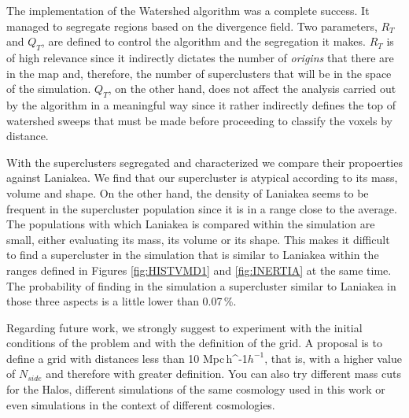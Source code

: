 \documentclass[usenatbib]{mnras}
\newcommand{\Mpch}{\,{\rm Mpc}\,\ifmmode h^{-1}\else $h^{-1}$\fi}
\begin{document}
The implementation of the Watershed algorithm was a complete
success. It managed to segregate regions based on the divergence
field. Two parameters, $R_T$ and $Q_T$, are defined to control the
algorithm and the segregation it makes. $R_T$ is of high relevance
since it indirectly dictates the number of \emph{origins} that there
are in the map and, therefore, the number of superclusters that will
be in the space of the simulation. $Q_T$, on the other hand, does not
affect the analysis carried out by the algorithm in a meaningful way
since it rather indirectly defines the top of watershed sweeps that
must be made before proceeding to classify the voxels by distance. 

With the superclusters segregated and characterized we compare their
propoerties against Laniakea. We find that our supercluster is
atypical according to its mass, volume and shape. On the other hand,
the density of Laniakea seems to be frequent in the supercluster
population since it is in a range close to the average. The
populations with which Laniakea is compared within the simulation are
small, either evaluating its mass, its volume or its shape. This makes
it difficult to find a supercluster in the simulation that is similar
to Laniakea within the ranges defined in Figures \ref{fig:HISTVMD1}
and \ref{fig:INERTIA} at the same time. The probability of finding in
the simulation a supercluster similar to Laniakea in those three
aspects is a little lower than 0.07\,\%. 

Regarding future work, we strongly suggest to experiment with the
initial conditions of the problem and with the definition of the
grid. A proposal is to define a grid with distances less than
10\,\Mpch, that is, with a higher value of $N_{side}$ and therefore
with greater definition. You can also try different mass cuts for the
Halos, different simulations of the same cosmology used in this work
or even simulations in the context of different cosmologies. 





\end{document}
